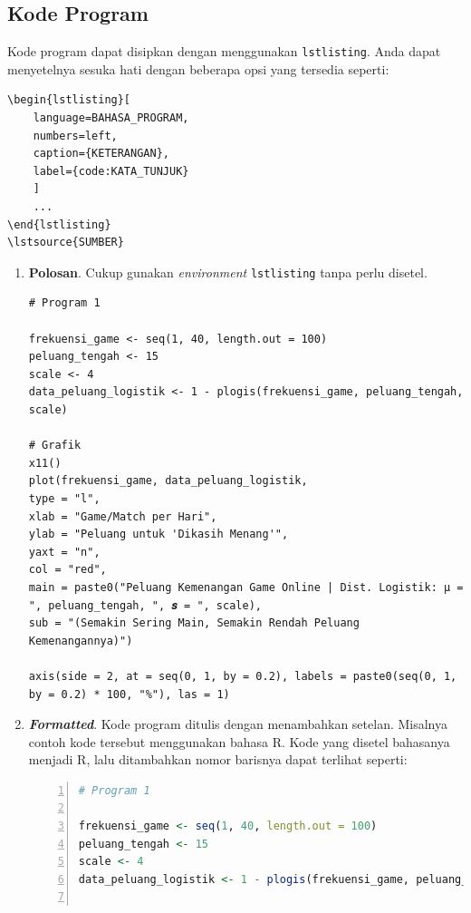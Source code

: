 \subsection{Kode Program}

Kode program dapat disipkan dengan menggunakan \texttt{lstlisting}. Anda dapat menyetelnya sesuka hati dengan beberapa opsi yang tersedia seperti:

\begin{verbatim}
\begin{lstlisting}[
    language=BAHASA_PROGRAM, 
    numbers=left, 
    caption={KETERANGAN}, 
    label={code:KATA_TUNJUK}
    ]
    ...
\end{lstlisting}
\lstsource{SUMBER}
\end{verbatim}

\begin{enumerate}[]
    \item \textbf{Polosan}. Cukup gunakan \textit{environment} \texttt{lstlisting} tanpa perlu disetel.
    
    \begin{lstlisting}
# Program 1

frekuensi_game <- seq(1, 40, length.out = 100)
peluang_tengah <- 15
scale <- 4
data_peluang_logistik <- 1 - plogis(frekuensi_game, peluang_tengah, scale)

# Grafik
x11()
plot(frekuensi_game, data_peluang_logistik,
type = "l",
xlab = "Game/Match per Hari",
ylab = "Peluang untuk 'Dikasih Menang'",
yaxt = "n",
col = "red",
main = paste0("Peluang Kemenangan Game Online | Dist. Logistik: μ = ", peluang_tengah, ", 𝒔 = ", scale),
sub = "(Semakin Sering Main, Semakin Rendah Peluang Kemenangannya)")

axis(side = 2, at = seq(0, 1, by = 0.2), labels = paste0(seq(0, 1, by = 0.2) * 100, "%"), las = 1)
    \end{lstlisting}
    
    \item \textbf{\textit{Formatted}}. Kode program ditulis dengan menambahkan setelan. Misalnya contoh kode tersebut menggunakan bahasa R. Kode yang disetel bahasanya menjadi R, lalu ditambahkan nomor barisnya dapat terlihat seperti:
    
    \begin{lstlisting}[language=R, numbers=left]
# Program 1

frekuensi_game <- seq(1, 40, length.out = 100)
peluang_tengah <- 15
scale <- 4
data_peluang_logistik <- 1 - plogis(frekuensi_game, peluang_tengah, scale)


\end{lstlisting}
\end{enumerate}
